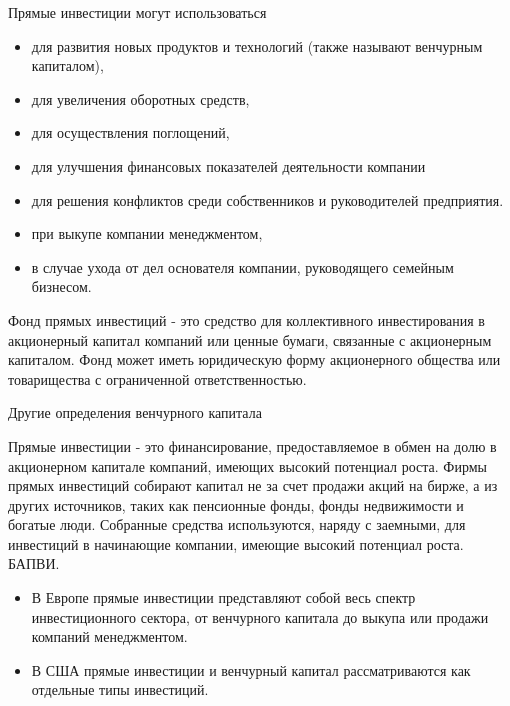 \documentclass[_Venture_p1.tex]{subfiles}
\begin{document}
\begin{frame}{Прямые инвестиции могут использоваться}
\begin{itemize}
	\small
	\item для развития новых продуктов и технологий (также называют венчурным капиталом), 
	\item для увеличения оборотных средств, 
	\item для осуществления поглощений, 
	\item для улучшения финансовых показателей деятельности компании
	\item для решения конфликтов среди собственников и руководителей предприятия. 
	\item при выкупе компании менеджментом, 
	\item в случае ухода от дел основателя компании, руководящего семейным бизнесом.
\end{itemize}
\end{frame}

\begin{frame}
\begin{block}{Фонд прямых инвестиций }
	\quad 
	- это средство для коллективного инвестирования в акционерный капитал компаний или ценные бумаги, связанные с акционерным капиталом. Фонд может иметь юридическую форму акционерного общества или товарищества с ограниченной ответственностью.
\end{block}
\end{frame}

\begin{frame}{Другие определения венчурного капитала}
\begin{block}{Прямые инвестиции }
	\quad 
	- это финансирование, предоставляемое в обмен на долю в акционерном капитале компаний, имеющих высокий потенциал роста. Фирмы прямых инвестиций собирают капитал не за счет продажи акций на бирже, а из других источников, таких как пенсионные фонды, фонды недвижимости и богатые люди. Собранные средства используются, наряду с заемными, для инвестиций в начинающие компании, имеющие высокий потенциал роста. БАПВИ.
\end{block}
\end{frame}

\begin{frame}
\begin{itemize}
	\item В Европе прямые инвестиции представляют собой весь спектр инвестиционного сектора, от венчурного капитала до выкупа или продажи компаний менеджментом. 
	\item В США прямые инвестиции и венчурный капитал рассматриваются как отдельные типы инвестиций.
\end{itemize}
\end{frame}
\end{document}
